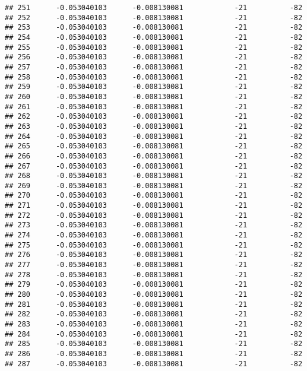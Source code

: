 \documentclass[]{article}
\begin{document}
\begin{verbatim}
## 251      -0.053040103      -0.008130081            -21          -82
## 252      -0.053040103      -0.008130081            -21          -82
## 253      -0.053040103      -0.008130081            -21          -82
## 254      -0.053040103      -0.008130081            -21          -82
## 255      -0.053040103      -0.008130081            -21          -82
## 256      -0.053040103      -0.008130081            -21          -82
## 257      -0.053040103      -0.008130081            -21          -82
## 258      -0.053040103      -0.008130081            -21          -82
## 259      -0.053040103      -0.008130081            -21          -82
## 260      -0.053040103      -0.008130081            -21          -82
## 261      -0.053040103      -0.008130081            -21          -82
## 262      -0.053040103      -0.008130081            -21          -82
## 263      -0.053040103      -0.008130081            -21          -82
## 264      -0.053040103      -0.008130081            -21          -82
## 265      -0.053040103      -0.008130081            -21          -82
## 266      -0.053040103      -0.008130081            -21          -82
## 267      -0.053040103      -0.008130081            -21          -82
## 268      -0.053040103      -0.008130081            -21          -82
## 269      -0.053040103      -0.008130081            -21          -82
## 270      -0.053040103      -0.008130081            -21          -82
## 271      -0.053040103      -0.008130081            -21          -82
## 272      -0.053040103      -0.008130081            -21          -82
## 273      -0.053040103      -0.008130081            -21          -82
## 274      -0.053040103      -0.008130081            -21          -82
## 275      -0.053040103      -0.008130081            -21          -82
## 276      -0.053040103      -0.008130081            -21          -82
## 277      -0.053040103      -0.008130081            -21          -82
## 278      -0.053040103      -0.008130081            -21          -82
## 279      -0.053040103      -0.008130081            -21          -82
## 280      -0.053040103      -0.008130081            -21          -82
## 281      -0.053040103      -0.008130081            -21          -82
## 282      -0.053040103      -0.008130081            -21          -82
## 283      -0.053040103      -0.008130081            -21          -82
## 284      -0.053040103      -0.008130081            -21          -82
## 285      -0.053040103      -0.008130081            -21          -82
## 286      -0.053040103      -0.008130081            -21          -82
## 287      -0.053040103      -0.008130081            -21          -82

\end{verbatim}
\end{document}
